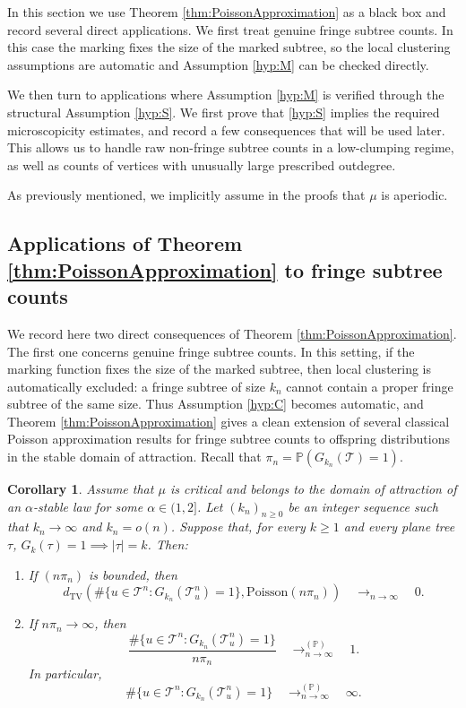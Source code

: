 \documentclass[a4paper,11pt]{article}
\newtheorem{corollary}[theorem]{Corollary}
\DeclareRobustCommand{\P}{\mathbb{P}}
\DeclareRobustCommand{\1}{\mathbf{1}}
\newcommand{\dTV}{d_{\mathrm{TV}}}
\newcommand{\Po}{\mathrm{Poisson}}
\begin{document}
In this section we use Theorem \ref{thm:PoissonApproximation} as a black box
and record several direct applications. We first treat genuine fringe subtree
counts. In this case the marking fixes the size of the marked subtree, so the
local clustering assumptions are automatic and Assumption \ref{hyp:M} can be
checked directly.

We then turn to applications where Assumption \ref{hyp:M} is verified through
the structural Assumption \ref{hyp:S}. We first prove that \ref{hyp:S}
implies the required microscopicity estimates, and record a few consequences
that will be used later. This allows us to handle raw non-fringe subtree
counts in a low-clumping regime, as well as counts of vertices with unusually
large prescribed outdegree.

As previously mentioned, we implicitly assume in the proofs that $\mu$ is aperiodic.


\subsection{Applications of Theorem \ref{thm:PoissonApproximation}  to fringe subtree counts}
\label{ssec:fringe}

We record here two direct consequences of Theorem
\ref{thm:PoissonApproximation}. The first one concerns genuine fringe subtree
counts. In this setting, if the marking function fixes the size of the marked
subtree, then local clustering is automatically excluded: a fringe subtree of
size $k_n$ cannot contain a proper fringe subtree of the same size. Thus
Assumption \ref{hyp:C} becomes automatic, and Theorem
\ref{thm:PoissonApproximation} gives a clean extension of several classical
Poisson approximation results for fringe subtree counts to offspring
distributions in the stable domain of attraction. Recall that $\pi_n=\P(G_{k_n}(\mathcal T)=1)$.

\begin{corollary}
\label{cor:Poisson_fringe}
Assume that $\mu$ is critical and belongs to the domain of attraction
of an $\alpha$-stable law for some $\alpha\in(1,2]$. Let $(k_n)_{n\geq 0}$ be
an integer sequence such that $k_n\to\infty$ and $k_n=o(n)$.
Suppose that, for every $k\ge1$ and every plane tree $\tau$, $
G_k(\tau)=1
\implies
|\tau|=k$.
Then:
\begin{enumerate}
\item[(i)] If $(n\pi_n)$ is bounded, then
\begin{equation}
\label{eq:DTVfringe}
\dTV \left(
\# \{u \in \mathcal{T}^{n} : G_{k_{n}}( \mathcal{T}^{n}_{u})=1\},
\Po(n \pi_{n})
\right)
\quad \mathop{\longrightarrow}_{n \rightarrow \infty} \quad 0.
\end{equation}

\item[(ii)] If $n\pi_n\to\infty$, then
$$
\frac{
\#\{u\in\mathcal T^n: G_{k_n}(\mathcal T^n_u)=1\}
}{n\pi_n}
\quad \mathop{\longrightarrow}^{(\P)}_{n \rightarrow \infty} \quad 1.
$$
In particular,
$$
\#\{u\in\mathcal T^n: G_{k_n}(\mathcal T^n_u)=1\}
\quad \mathop{\longrightarrow}^{(\P)}_{n \rightarrow \infty} \quad \infty.
$$
\end{enumerate}
\end{corollary}
\end{document}
